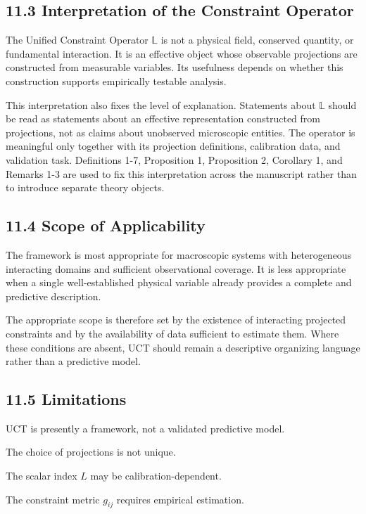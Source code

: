 \subsection{11.3 Interpretation of the Constraint Operator}

The Unified Constraint Operator \(\mathbb{L}\) is not a physical field, conserved quantity, or fundamental interaction. It is an effective object whose observable projections are constructed from measurable variables. Its usefulness depends on whether this construction supports empirically testable analysis.

This interpretation also fixes the level of explanation. Statements about \(\mathbb{L}\) should be read as statements about an effective representation constructed from projections, not as claims about unobserved microscopic entities. The operator is meaningful only together with its projection definitions, calibration data, and validation task. Definitions 1-7, Proposition 1, Proposition 2, Corollary 1, and Remarks 1-3 are used to fix this interpretation across the manuscript rather than to introduce separate theory objects.

\subsection{11.4 Scope of Applicability}

The framework is most appropriate for macroscopic systems with heterogeneous interacting domains and sufficient observational coverage. It is less appropriate when a single well-established physical variable already provides a complete and predictive description.

The appropriate scope is therefore set by the existence of interacting projected constraints and by the availability of data sufficient to estimate them. Where these conditions are absent, UCT should remain a descriptive organizing language rather than a predictive model.

\subsection{11.5 Limitations}

UCT is presently a framework, not a validated predictive model.

The choice of projections is not unique.

The scalar index \(L\) may be calibration-dependent.

The constraint metric \(g_{ij}\) requires empirical estimation.

